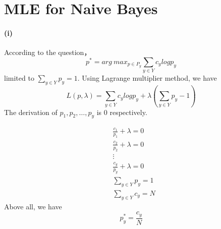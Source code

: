 \documentclass[UTF8]{article}
\begin{document}
\section{MLE for Naive Bayes}
\paragraph{(i)}
According to the question，
$$
  p^*=arg\ max_{p \in P_y} \sum_{y\in Y}c_ylog p_y
$$
limited to $\sum_{y \in Y}p_y = 1$.
Using Lagrange multiplier method, we have
$$
L(p,\lambda) = \sum_{y\in Y}c_ylog p_y + \lambda(\sum_{y \in Y}p_y-1)
$$
The derivation of $p_1,p_2,\dots,p_y$ is 0 respectively.

\begin{align*}
&  \frac{c_1}{p_1} + \lambda = 0 \\
&  \frac{c_2}{p_2} + \lambda = 0 \\
&  \vdots  \\
&  \frac{c_y}{p_y} + \lambda = 0 \\
&  \sum_{y \in Y}p_y = 1 \\
&  \sum_{y \in Y}c_y = N
\end{align*}
Above all, we have
$$ p_y^*=\frac{c_y}{N}$$
\end{document}
